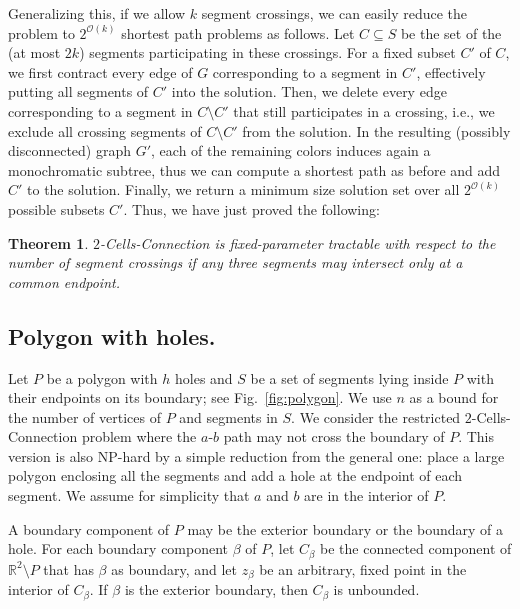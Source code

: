 \documentclass[11pt,a4paper]{article}
\newtheorem{theorem}[definition]{Theorem}
\begin{document}
Generalizing this, if we allow $k$ segment crossings, 
we can easily reduce the problem to $2^{\mathcal{O}(k)}$ shortest path problems as follows. Let $C \subseteq S$ be the set of the (at most $2k$) segments participating in these crossings. For a fixed subset $C'$ of $C$, we first contract every edge of $G$ corresponding to a segment in $C'$, effectively putting all segments of $C'$ into the solution. Then, we delete every edge corresponding to a segment in $C\setminus C'$  that still participates in a crossing, i.e., we exclude all crossing segments of $C\setminus C'$ from the solution. 
In the resulting (possibly disconnected) graph $G'$, each of the remaining colors induces again a monochromatic subtree, thus we can compute a shortest path as before and add $C'$ to the solution. Finally, we return a minimum size solution set over all $2^{\mathcal{O}(k)}$ possible subsets $C'$. 
Thus, we have just proved the following:

\begin{theorem}
{\sc $2$-Cells-Connection} is fixed-parameter tractable with respect to the number of segment crossings if any three segments may intersect only at a common endpoint.
\end{theorem}

\subsection{Polygon with holes.}
Let $P$ be a polygon with $h$ holes and $S$ be a set of segments lying inside $P$ with their endpoints on its boundary; see Fig.~\ref{fig:polygon}. We use $n$ as a bound for the number of vertices of $P$ and segments in $S$. 
We consider the restricted {\sc $2$-Cells-Connection} problem where the $a$-$b$ path may not cross the boundary of $P$. This version is also NP-hard by a simple reduction from the general one: place a large polygon enclosing all the segments and add a hole at the endpoint of each segment. 
We assume for simplicity that $a$ and $b$ are in the interior of $P$. 

A boundary component of $P$ may be the exterior boundary or the boundary of a hole. For each boundary component $\beta$ of $P$, let $C_\beta$ be the connected component of $\mathbb{R}^2\setminus P$ that has $\beta$ as boundary, and let $z_\beta$ be an arbitrary, fixed point in the interior of $C_\beta$. If $\beta$ is the exterior boundary, then $C_\beta$ is unbounded.
\end{document}
